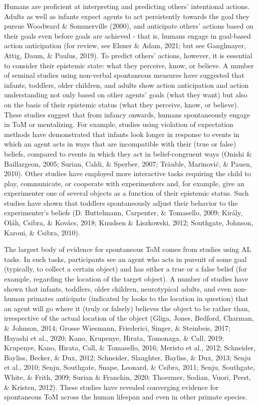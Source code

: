 \documentclass[
  man,floatsintext]{apa6}
\begin{document}
Humans are proficient at interpreting and predicting others' intentional actions. Adults as well as infants expect agents to act persistently towards the goal they pursue Woodward \& Sommerville (2000), and anticipate others' actions based on their goals even before goals are achieved - that is, humans engage in goal-based action anticipation (for review, see Elsner \& Adam, 2021; but see Ganglmayer, Attig, Daum, \& Paulus, 2019). To predict others' actions, however, it is essential to consider their epistemic state: what they perceive, know, or believe. A number of seminal studies using non-verbal spontaneous measures have suggested that infants, toddlers, older children, and adults show action anticipation and action understanding not only based on other agents' goals (what they want) but also on the basis of their epistemic status (what they perceive, know, or believe). These studies suggest that from infancy onwards, humans spontaneously engage in ToM or mentalizing. For example, studies using violation of expectation methods have demonstrated that infants look longer in response to events in which an agent acts in ways that are incompatible with their (true or false) beliefs, compared to events in which they act in belief-congruent ways (Onishi \& Baillargeon, 2005; Surian, Caldi, \& Sperber, 2007; Träuble, Marinović, \& Pauen, 2010). Other studies have employed more interactive tasks requiring the child to play, communicate, or cooperate with experimenters and, for example, give an experimenter one of several objects as a function of their epistemic status. Such studies have shown that toddlers spontaneously adjust their behavior to the experimenter's beliefs (D. Buttelmann, Carpenter, \& Tomasello, 2009; Király, Oláh, Csibra, \& Kovács, 2018; Knudsen \& Liszkowski, 2012; Southgate, Johnson, Karoui, \& Csibra, 2010).

The largest body of evidence for spontaneous ToM comes from studies using AL tasks. In such tasks, participants see an agent who acts in pursuit of some goal (typically, to collect a certain object) and has either a true or a false belief (for example, regarding the location of the target object). A number of studies have shown that infants, toddlers, older children, neurotypical adults, and even non-human primates anticipate (indicated by looks to the location in question) that an agent will go where it (truly or falsely) believes the object to be rather than, irrespective of the actual location of the object (Gliga, Jones, Bedford, Charman, \& Johnson, 2014; Grosse Wiesmann, Friederici, Singer, \& Steinbeis, 2017; Hayashi et al., 2020; Kano, Krupenye, Hirata, Tomonaga, \& Call, 2019; Krupenye, Kano, Hirata, Call, \& Tomasello, 2016; Meristo et al., 2012; Schneider, Bayliss, Becker, \& Dux, 2012; Schneider, Slaughter, Bayliss, \& Dux, 2013; Senju et al., 2010; Senju, Southgate, Snape, Leonard, \& Csibra, 2011; Senju, Southgate, White, \& Frith, 2009; Surian \& Franchin, 2020; Thoermer, Sodian, Vuori, Perst, \& Kristen, 2012). These studies have revealed converging evidence for spontaneous ToM across the human lifespan and even in other primate species.
\end{document}
